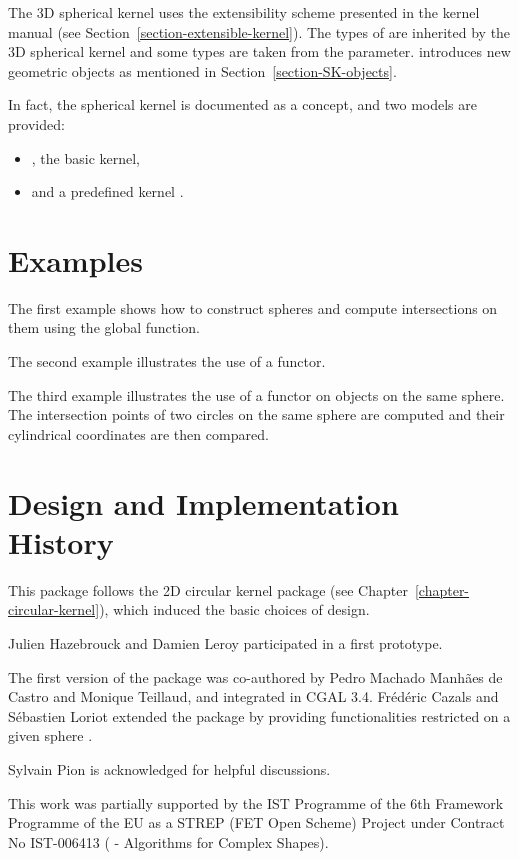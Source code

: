 The 3D spherical kernel uses the extensibility scheme presented in the
kernel manual (see Section~\ref{section-extensible-kernel}). The types
of  are inherited by the 3D spherical kernel and some
types are taken from the 
parameter.  introduces new geometric objects
as mentioned in Section~\ref{section-SK-objects}.

In fact, the spherical kernel is documented as a concept,
 and two models are provided: 
\begin{itemize}
\item {} , the basic kernel,
\item {} and a predefined kernel .
\end{itemize}

\section{Examples}

The first example shows how to construct spheres and compute
intersections on them using the global function.


The second example illustrates the use of a functor. 


  The third example illustrates the use of a functor on objects on the
  same sphere.  The intersection points of two circles on
  the same sphere are computed and their cylindrical coordinates are
  then compared.


\section{Design and Implementation History}

This package follows the 2D circular kernel package (see
Chapter~\ref{chapter-circular-kernel}), which induced the basic
choices of design.

Julien Hazebrouck and Damien Leroy participated in a first
prototype.

  The first version of the package was co-authored by Pedro Machado
  Manh\~{a}es de Castro and Monique Teillaud, and integrated in CGAL
  3.4.  Fr\'ed\'eric Cazals and S\'ebastien Loriot extended the
  package by providing functionalities restricted on a given sphere
  \cite{cclt-dc3sk-08}.  

Sylvain Pion is acknowledged for helpful discussions.

This work was partially supported by the IST Programme of the 6th
Framework Programme of the EU as a STREP (FET Open Scheme) Project
under Contract No IST-006413 ( -
Algorithms for Complex Shapes).
